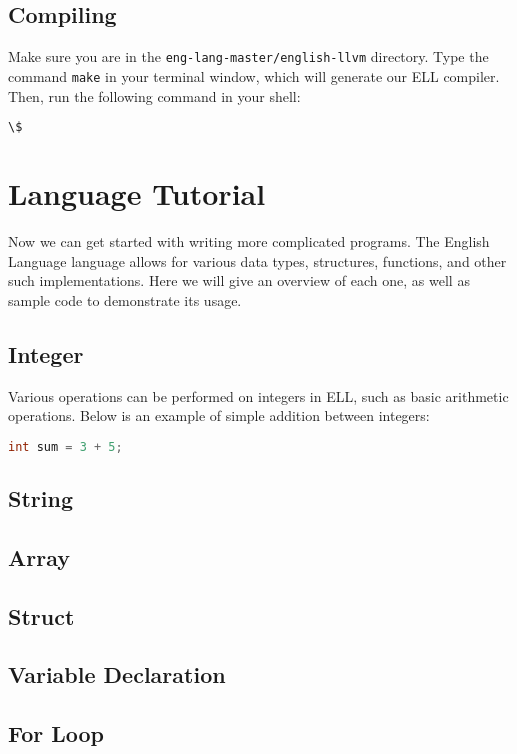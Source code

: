 \documentclass{article}
\begin{document}
\subsection{Compiling}
Make sure you are in the {\ttfamily\texttt{eng-lang-master/english-llvm}} directory. Type the command {\ttfamily\texttt{make}} in your terminal window, which will generate our ELL compiler. Then, run the following command in your shell:
\begin{lstlisting}[language=bash]
 \$ 
\end{lstlisting}


\newpage
\section{Language Tutorial}
Now we can get started with writing more complicated programs. The English Language language allows for various data types, structures, functions, and other such implementations. Here we will give an overview of each one, as well as sample code to demonstrate its usage.
\subsection{Integer}
Various operations can be performed on integers in ELL, such as basic arithmetic operations. Below is an example of simple addition between integers:
\begin{lstlisting}[language=C]
int sum = 3 + 5;
\end{lstlisting}

\subsection{String}

\subsection{Array}

\subsection{Struct}

\subsection{Variable Declaration}

\subsection{For Loop}
\end{document}

